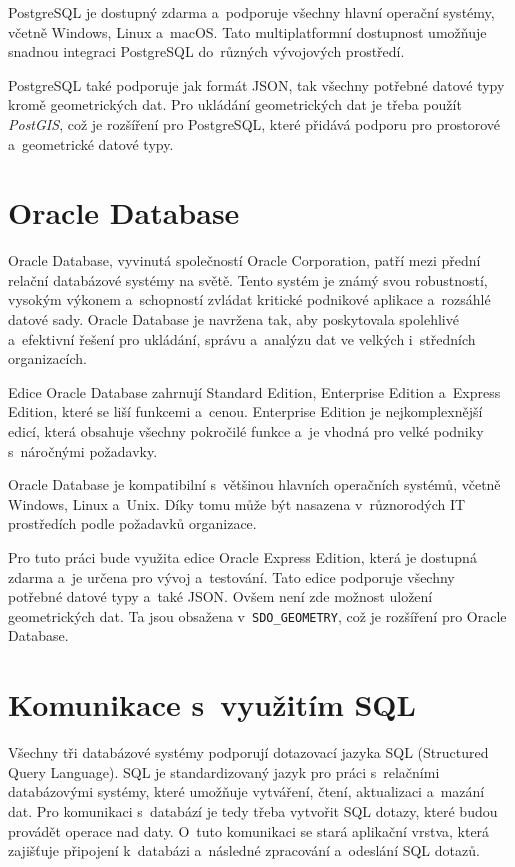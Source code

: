 PostgreSQL je dostupný zdarma a~podporuje všechny hlavní operační systémy, včetně Windows, Linux a~macOS. 
Tato multiplatformní dostupnost umožňuje snadnou integraci PostgreSQL do~různých vývojových prostředí.
\cite{postgresql}

PostgreSQL také podporuje jak formát JSON, tak všechny potřebné datové typy kromě geometrických dat.
Pro ukládání geometrických dat je třeba použít \textit{PostGIS}, což je rozšíření pro PostgreSQL, které přidává
podporu pro prostorové a~geometrické datové typy.

\section{Oracle Database}
Oracle Database, vyvinutá společností Oracle Corporation, patří mezi přední relační 
databázové systémy na světě. Tento systém je známý svou robustností, vysokým výkonem 
a~schopností zvládat kritické podnikové aplikace a~rozsáhlé datové sady. Oracle Database 
je navržena tak, aby poskytovala spolehlivé a~efektivní řešení pro ukládání, správu 
a~analýzu dat ve velkých i~středních organizacích.

Edice Oracle Database zahrnují Standard Edition, Enterprise Edition a~Express Edition,
které se liší funkcemi a~cenou. Enterprise Edition je nejkomplexnější edicí, která
obsahuje všechny pokročilé funkce a~je vhodná pro velké podniky s~náročnými požadavky.

Oracle Database je kompatibilní s~většinou hlavních operačních systémů, včetně Windows, 
Linux a~Unix. Díky tomu může být nasazena v~různorodých IT prostředích podle požadavků organizace.
\cite{oracle_database}

Pro tuto práci bude využita edice Oracle Express Edition, která je dostupná zdarma a~je určena pro vývoj a~testování.
Tato edice podporuje všechny potřebné datové typy a~také JSON. Ovšem není zde možnost 
uložení geometrických dat. Ta jsou obsažena v~\texttt{SDO\_GEOMETRY}, což je rozšíření pro Oracle Database.

\section{Komunikace s~využitím SQL}
Všechny tři databázové systémy podporují dotazovací jazyka SQL (Structured Query Language).
SQL je standardizovaný jazyk pro práci s~relačními databázovými systémy, které umožňuje vytváření, čtení, aktualizaci a~mazání dat.
Pro komunikaci s~databází je tedy třeba vytvořit SQL dotazy, které budou provádět operace nad daty.
O~tuto komunikaci se stará aplikační vrstva, která zajišťuje připojení k~databázi a~následné zpracování a~odeslání SQL dotazů.

